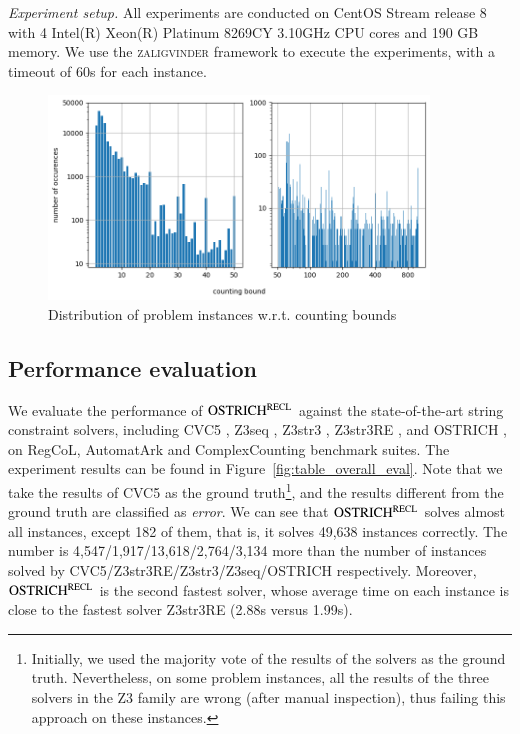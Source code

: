 \medskip
\noindent
\emph{Experiment setup.}
All experiments are conducted on CentOS Stream release 8 with 4 Intel(R) Xeon(R) Platinum 8269CY 3.10GHz CPU cores and 190 GB memory. We use the \textsc{zaligvinder} framework \cite{zaligvinder_2021} to execute the experiments, with a timeout of 60s for each instance.


%
\begin{figure}
  \centering\vskip 0pt
  \includegraphics[width=0.9\textwidth]{counting_distribution.png}  
  \caption{Distribution of problem instances w.r.t. counting bounds}  
  \label{fig:count_distri}
\end{figure}

\subsection{Performance evaluation}\label{subsec:overall_eval}

We evaluate the performance of $\rm OSTRICH^{RECL}$ against the state-of-the-art string constraint solvers, including CVC5
\cite{cvc5}, Z3seq \cite{z3seq}, Z3str3
\cite{Z3-str3}, Z3str3RE \cite{BD+23}, and OSTRICH
\cite{CHL+19}, on RegCoL, AutomatArk and ComplexCounting benchmark suites.
The experiment results can be found in Figure~\ref{fig:table_overall_eval}. Note that we take the results of CVC5 as the ground truth\footnote{Initially,  we used the majority vote of the results of the solvers as the ground truth. Nevertheless, on some problem instances, all the results of the three solvers in the Z3 family are wrong (after manual inspection), thus failing this approach on these instances.}, and the results different from the ground truth are classified as \emph{error}. We can see that $\rm OSTRICH^{RECL}$ solves almost all instances, except 182 of them, that is, it solves 49,638 instances correctly. The number is 4,547/1,917/13,618/2,764/3,134 more than the number of instances solved by CVC5/Z3str3RE/Z3str3/Z3seq/OSTRICH respectively.
%
Moreover, $\rm OSTRICH^{RECL}$ is the second fastest solver, whose average time on each instance is close to the fastest solver Z3str3RE (2.88s versus 1.99s). 

